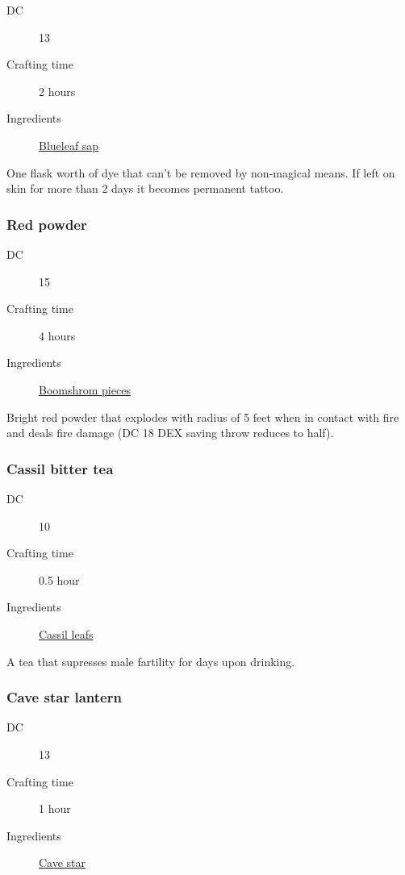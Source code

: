 \begin{description}
\item [DC] 13
\item [Crafting time] 2 hours
\item [Ingredients] \hyperref[Blueleaf]{Blueleaf sap}
\end{description}

One flask worth of dye that can't be removed by non-magical means. 
If left on skin for more than 2 days it becomes permanent tattoo.

\subsubsection{Red powder}
\label{Red powder}

\begin{description}
\item [DC] 15
\item [Crafting time] 4 hours
\item [Ingredients] \hyperref[Boomsrhoom]{Boomshrom pieces}
\end{description}

Bright red powder that explodes with radius of 5 feet when in contact with fire and deals  fire damage (DC 18 DEX saving throw reduces to half).

\subsubsection{Cassil bitter tea}
\label{Cassil bitter tea}

\begin{description}
\item [DC] 10
\item [Crafting time] 0.5 hour
\item [Ingredients] \hyperref[Cassil]{Cassil leafs}
\end{description}

A tea that supresses male fartility for  days upon drinking.

\subsubsection{Cave star lantern}
\label{Cave star lantern}

\begin{description}
\item [DC] 13
\item [Crafting time] 1 hour
\item [Ingredients] \hyperref[Cave Star]{Cave star}
\end{description}

